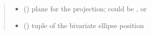 \documentclass[letterpaper,10pt,english]{sphinxmanual}
\begin{document}
\begin{fulllineitems}
\begin{quote}
\begin{description}
\begin{itemize}
\item {} 
\sphinxAtStartPar
{} () \textendash{} plane for the projection; could be ,  or 

\item {} 
\sphinxAtStartPar
{} () \textendash{} tuple of the bivariate ellipse position

\end{itemize}

\end{description}\end{quote}

\end{fulllineitems}

\end{document}
